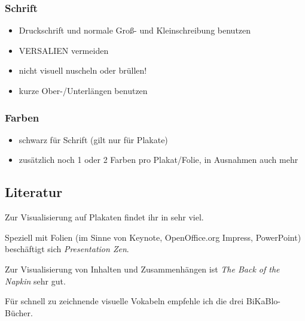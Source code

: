 \subsubsection{Schrift}
\begin{itemize}
  \item Druckschrift und normale Groß- und Kleinschreibung benutzen
  \item VERSALIEN vermeiden
  \item nicht visuell {\tiny nuscheln} oder {\LARGE brüllen}!
  \item kurze Ober-/Unterlängen benutzen
\end{itemize}

\subsubsection{Farben}
\begin{itemize}
  \item schwarz für Schrift (gilt nur für Plakate)
  \item zusätzlich noch 1 oder 2 Farben pro Plakat/Folie, in Ausnahmen auch mehr
\end{itemize}

\subsection{Literatur}
Zur Visualisierung auf Plakaten findet ihr in \cite{visualisieren-praesentieren-moderieren} sehr viel.

Speziell mit Folien (im Sinne von Keynote, OpenOffice.org Impress, PowerPoint) beschäftigt sich \emph{Presentation Zen}\cite{presentation-zen}.

Zur Visualisierung von Inhalten und Zusammenhängen ist \emph{The Back of the Napkin}\cite{napkin} sehr gut.

Für schnell zu zeichnende visuelle Vokabeln empfehle ich die drei BiKaBlo-Bücher.~\cite{bikablo, bikablo-2, bikablo-emotions}
